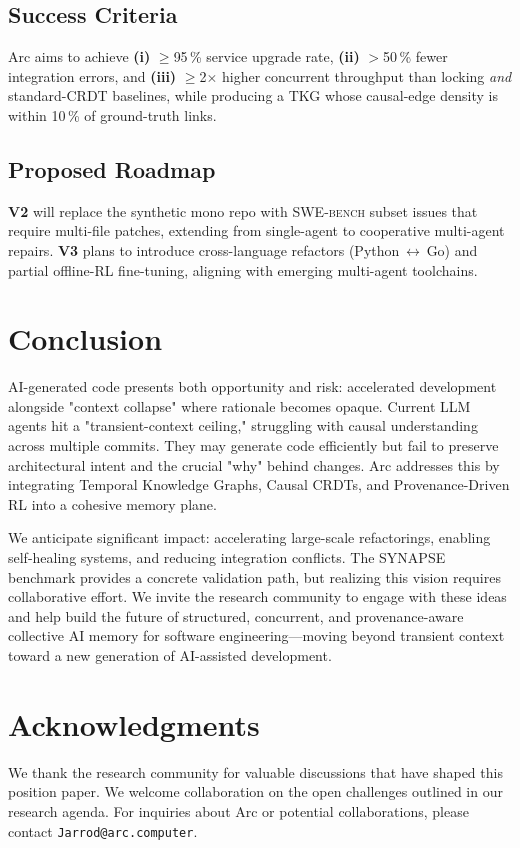 \documentclass{article}
\begin{document}
\subsection{Success Criteria}
Arc aims to achieve \textbf{(i)} $\ge$95\,\% service upgrade rate, \textbf{(ii)} $>$50\,\% fewer integration errors, and \textbf{(iii)} $\ge$2$\times$ higher concurrent throughput than locking \emph{and} standard-CRDT baselines, while producing a TKG whose causal-edge density is within 10\,\% of ground-truth links.

\subsection{Proposed Roadmap}

\textbf{V2} will replace the synthetic mono repo with  \textsc{SWE-bench} subset issues that require multi-file patches, extending from single-agent to cooperative multi-agent repairs. \textbf{V3} plans to introduce cross-language refactors (Python $\leftrightarrow$ Go) and partial offline-RL fine-tuning, aligning with emerging multi-agent toolchains.

\section{Conclusion}
AI-generated code presents both opportunity and risk: accelerated development alongside "context collapse" where rationale becomes opaque. Current LLM agents hit a "transient-context ceiling," struggling with causal understanding across multiple commits. They may generate code efficiently but fail to preserve architectural intent and the crucial "why" behind changes. Arc addresses this by integrating Temporal Knowledge Graphs, Causal CRDTs, and Provenance-Driven RL into a cohesive memory plane.

We anticipate significant impact: accelerating large-scale refactorings, enabling self-healing systems, and reducing integration conflicts. The SYNAPSE benchmark provides a concrete validation path, but realizing this vision requires collaborative effort. We invite the research community to engage with these ideas and help build the future of structured, concurrent, and provenance-aware collective AI memory for software engineering—moving beyond transient context toward a new generation of AI-assisted development.

\section*{Acknowledgments}
We thank the research community for valuable discussions that have shaped this position paper. We welcome collaboration on the open challenges outlined in our research agenda. For inquiries about Arc or potential collaborations, please contact \texttt{Jarrod@arc.computer}.
\end{document}
